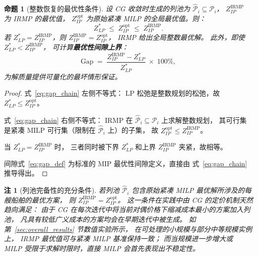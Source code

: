 \documentclass[UTF8, a4paper, 12pt]{ctexart}
\newtheorem{proposition}{命题}
\newtheorem{remark}{注}
\begin{document}
\begin{proposition}[整数恢复的最优性条件]
\label{prop:integer_recovery}
设 CG 收敛时生成的列池为 $\hat{\mathcal{P}}_i\subseteq\mathcal{P}_i$，
$Z_{IP}^{\text{IRMP}}$ 为 IRMP 的最优值，
$Z_{IP}^{\text{opt}}$ 为原始紧凑 MILP 的全局最优值。则：
\begin{equation}
  Z_{LP}^* \;\le\; Z_{IP}^{\text{opt}} \;\le\; Z_{IP}^{\text{IRMP}}.
  \label{eq:gap_chain}
\end{equation}
若 $Z_{LP}^* = Z_{IP}^{\text{IRMP}}$，则 $Z_{IP}^{\text{IRMP}} = Z_{IP}^{\text{opt}}$，
IRMP 给出全局整数最优解。
此外，即使 $Z_{LP}^* < Z_{IP}^{\text{IRMP}}$，
可计算\textbf{最优性间隙上界}：
\begin{equation}
  \text{Gap} \;=\; \frac{Z_{IP}^{\text{IRMP}} - Z_{LP}^*}{Z_{LP}^*} \;\times\; 100\%,
  \label{eq:gap_def}
\end{equation}
为解质量提供可量化的最坏情形保证。
\end{proposition}

\begin{proof}
式~\eqref{eq:gap_chain} 左侧不等式：
LP 松弛是整数规划的松弛，故 $Z_{LP}^*\le Z_{IP}^{\text{opt}}$。

式~\eqref{eq:gap_chain} 右侧不等式：
IRMP 在 $\hat{\mathcal{P}}_i\subseteq\mathcal{P}_i$ 上求解整数规划，
其可行集是紧凑 MILP 可行集（限制在 $\hat{\mathcal{P}}_i$ 上）的子集，
故 $Z_{IP}^{\text{opt}}\le Z_{IP}^{\text{IRMP}}$。

当 $Z_{LP}^* = Z_{IP}^{\text{IRMP}}$ 时，
三者同时被下界 $Z_{LP}^*$ 和上界 $Z_{IP}^{\text{IRMP}}$ 夹紧，故相等。

间隙式~\eqref{eq:gap_def} 为标准的 MIP 最优性间隙定义，直接由
式~\eqref{eq:gap_chain} 推导得出。
\end{proof}

\begin{remark}[列池完备性的充分条件]
\label{rem:pool_complete}
若列池 $\hat{\mathcal{P}}_i$ 包含原始紧凑 MILP 最优解所涉及的每艘船舶的最优方案，
则 $Z_{IP}^{\text{IRMP}} = Z_{IP}^{\text{opt}}$。
这一条件在实践中由 CG 的定价机制天然趋向满足：
由于 CG 在每次迭代中将当前对偶价格下缩减成本最小的方案加入列池，
凡具有较低广义成本的方案均会在早期迭代中被生成。
如第~\ref{sec:overall_results} 节数值实验所示，
在可处理的小规模与部分中等规模实例上，
IRMP 最优值可与紧凑 MILP 基准保持一致；
而当规模进一步增大或 MILP 受限于求解时限时，直接 MILP 会首先表现出不稳定性。
\end{remark}

\end{document}
